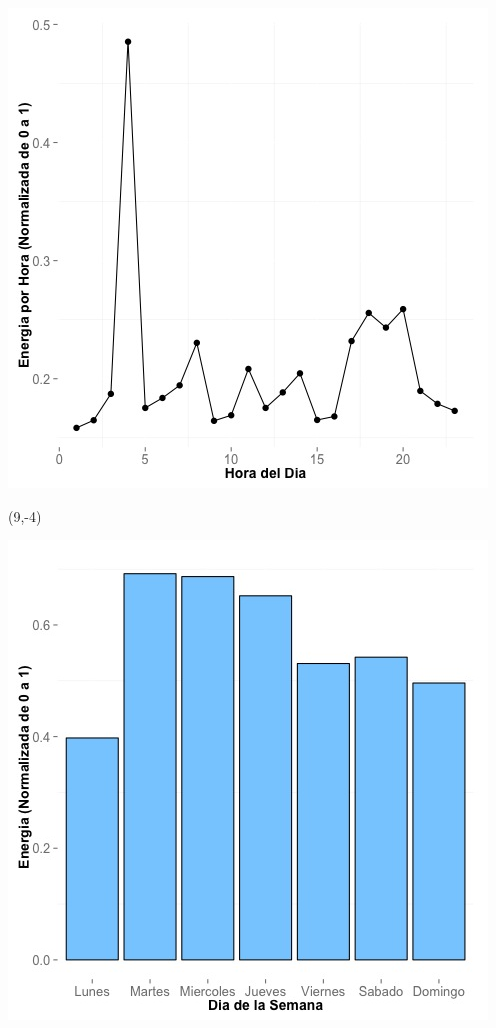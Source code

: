 \documentclass{article}\usepackage[]{graphicx}\usepackage[]{color}
\newenvironment{knitrout}{}{} %
\begin{document}
\begin{knitrout}
\color{fgcolor}
\includegraphics[scale=0.65]{figure/A1_plot_norm_median} 
\end{knitrout}


 \begin{textblock}{1}(9,-4)
\begin{minipage}{20em}
\begingroup

\endgroup
\end{minipage}
\end{textblock}


\begin{knitrout}
\color{fgcolor}
\includegraphics[scale=0.65]{figure/A1_day_of_week_plot} 
\end{knitrout}
\end{document}

